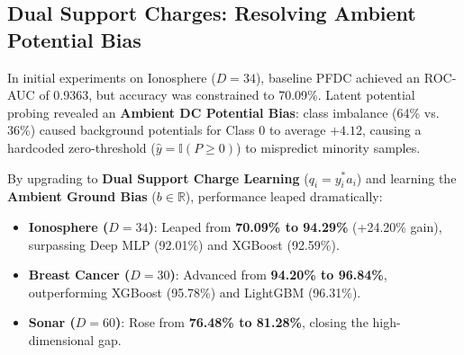 \documentclass[preprint,review,12pt]{elsarticle}
\begin{document}
\begin{table}[!htbp]
\centering
\small
\caption{5-Fold Cross-Validation Accuracy (\%) Across 6 Real-World Benchmarks.}
\label{tab:multidataset_6}
\end{table}

\subsection{Dual Support Charges: Resolving Ambient Potential Bias}
In initial experiments on Ionosphere ($D=34$), baseline PFDC achieved an ROC-AUC of 0.9363, but accuracy was constrained to 70.09\%. Latent potential probing revealed an \textbf{Ambient DC Potential Bias}: class imbalance (64\% vs. 36\%) caused background potentials for Class 0 to average $+4.12$, causing a hardcoded zero-threshold ($\hat{y} = \mathbb{I}(P \ge 0)$) to mispredict minority samples. 

By upgrading to \textbf{Dual Support Charge Learning} ($q_i = y_i^* a_i$) and learning the \textbf{Ambient Ground Bias} ($b \in \mathbb{R}$), performance leaped dramatically:
\begin{itemize}
    \item \textbf{Ionosphere ($D=34$)}: Leaped from \textbf{70.09\% to 94.29\%} (+24.20\% gain), surpassing Deep MLP (92.01\%) and XGBoost (92.59\%).
    \item \textbf{Breast Cancer ($D=30$)}: Advanced from \textbf{94.20\% to 96.84\%}, outperforming XGBoost (95.78\%) and LightGBM (96.31\%).
    \item \textbf{Sonar ($D=60$)}: Rose from \textbf{76.48\% to 81.28\%}, closing the high-dimensional gap.
\end{itemize}
\end{document}
